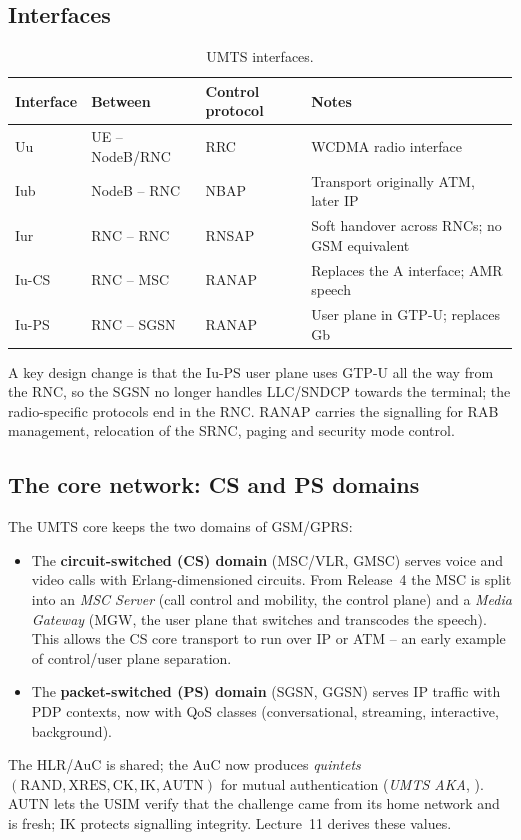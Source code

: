 \documentclass[11pt,a4paper]{article}
\begin{document}
\subsection{Interfaces}
\begin{table}[htbp]
\centering\small
\caption{UMTS interfaces.}\label{tab:if}
\begin{tabularx}{\linewidth}{@{}l l l Y@{}}
\toprule
{}Interface & Between & Control protocol & Notes \\
\midrule
Uu    & UE -- NodeB/RNC & RRC              & WCDMA radio interface \\
Iub   & NodeB -- RNC    & NBAP             & Transport originally ATM, later IP \\
Iur   & RNC -- RNC      & RNSAP            & Soft handover across RNCs; no GSM equivalent \\
Iu-CS & RNC -- MSC      & RANAP            & Replaces the A interface; AMR speech \\
Iu-PS & RNC -- SGSN     & RANAP            & User plane in GTP-U; replaces Gb \\
\bottomrule
\end{tabularx}
\end{table}

A key design change is that the Iu-PS user plane uses GTP-U all the way from the RNC, so the
SGSN no longer handles LLC/SNDCP towards the terminal; the radio-specific protocols end in the
RNC. RANAP \cite{ts25413} carries the signalling for RAB management, relocation of the SRNC,
paging and security mode control.

\subsection{The core network: CS and PS domains}
The UMTS core keeps the two domains of GSM/GPRS:
\begin{itemize}
  \item The \textbf{circuit-switched (CS) domain} (MSC/VLR, GMSC) serves voice and video calls
        with Erlang-dimensioned circuits. From Release~4 the MSC is split into an \emph{MSC Server}
        (call control and mobility, the control plane) and a \emph{Media Gateway} (MGW, the user
        plane that switches and transcodes the speech). This allows the CS core transport to run
        over IP or ATM -- an early example of control/user plane separation.
  \item The \textbf{packet-switched (PS) domain} (SGSN, GGSN) serves IP traffic with PDP
        contexts, now with QoS classes (conversational, streaming, interactive, background).
\end{itemize}
The HLR/AuC is shared; the AuC now produces \emph{quintets}
$(\text{RAND},\text{XRES},\text{CK},\text{IK},\text{AUTN})$ for mutual authentication
(\emph{UMTS AKA}, \cite{ts33102}). AUTN lets the USIM verify that the challenge came from its
home network and is fresh; IK protects signalling integrity. Lecture~11 derives these values.
\end{document}
